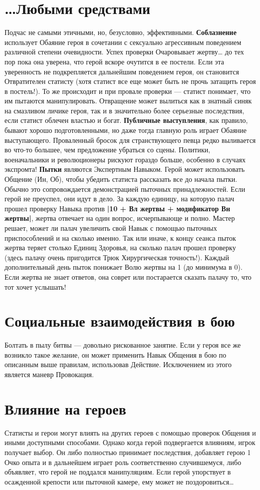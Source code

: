 \section{…Любыми средствами}
Подчас не самыми этичными, но, безусловно, эффективными.
\newline \textbf{Соблазнение} использует Обаяние героя в сочетании с сексуально агрессивным поведением различной степени очевидности. Успех проверки Очаровывает жертву… до тех пор пока она уверена, что герой вскоре очутится в ее постели. Если эта уверенность не подкрепляется дальнейшим поведением героя, он становится Отвратителен статисту (хотя статист все еще может быть не прочь затащить героя в постель!). То же происходит и при провале проверки — статист понимает, что им пытаются манипулировать. Отвращение может вылиться как в знатный синяк на смазливом личике героя, так и в значительно более серьезные последствия, если статист облечен властью и богат.
\newline \textbf{Публичные выступления}, как правило, бывают хорошо подготовленными, но даже тогда главную роль играет Обаяние выступающего. Проваленный бросок для странствующего певца редко выливается во что-то большее, чем предложение убраться со сцены. Политики, военачальники и революционеры рискуют гораздо больше, особенно в случаях экспромта!
\newline \textbf{Пытки} являются Экспертным Навыком. Герой может использовать Общение (Ин, Об), чтобы убедить статиста рассказать все до начала пытки. Обычно это сопровождается демонстрацией пыточных принадлежностей. Если герой не преуспел, они идут в дело. За каждую единицу, на которую палач прошел проверку Навыка против \textbf{|10 + Вл жертвы + модификатор Вн жертвы|}, жертва отвечает на один вопрос, исчерпывающе и полно. Мастер решает, может ли палач увеличить свой Навык с помощью пыточных приспособлений и на сколько именно. Так или иначе, к концу сеанса пыток жертва теряет столько Единиц Здоровья, на сколько палач прошел проверку (здесь палачу очень пригодится Трюк Хирургическая точность!). Каждый дополнительный день пыток понижает Волю жертвы на 1 (до минимума в 0). Если жертва не знает ответов, она соврет или постарается сказать палачу то, что тот хочет услышать!
\section{Социальные взаимодействия в бою}
Болтать в пылу битвы — довольно рискованное занятие. Если у героя все же возникло такое желание, он может применить Навык Общения в бою по описанным выше правилам, использовав Действие. Исключением из этого является маневр Провокация.
\section{Влияние на героев}
Статисты и герои могут влиять на других героев с помощью проверок Общения и иными доступными способами. Однако когда герой подвергается влияниям, игрок получает выбор. Он либо полностью принимает последствия, добавляет герою 1 Очко опыта и в дальнейшем играет роль соответственно случившемуся, либо объявляет, что герой не поддался манипуляциям. Если герой упорствует в осажденной крепости или пыточной камере, ему может не поздоровиться…